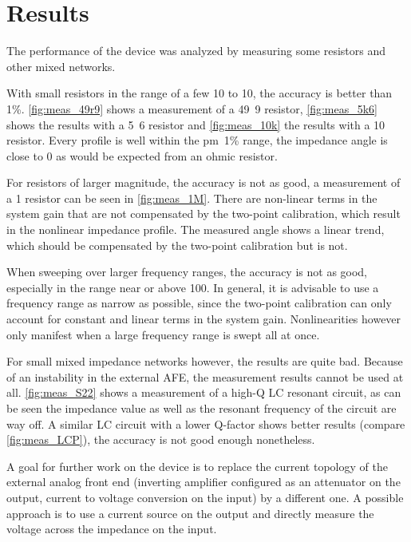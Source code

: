 \chapter{Results} \label{sec:results}

The performance of the device was analyzed by measuring some resistors and other mixed networks.

With small resistors in the range of a few \unit{10}{\ohm} to \unit{10}{\kilo\ohm}, the accuracy is better than
\unit{1}{\%}.
\autoref{fig:meas_49r9} shows a measurement of a \unit{49.9}{\ohm} resistor,
\autoref{fig:meas_5k6} shows the results with a \unit{5.6}{\kilo\ohm} resistor
and \autoref{fig:meas_10k} the results with a \unit{10}{\kilo\ohm} resistor.
Every profile is well within the \unit{\pm 1}{\%} range, the impedance angle is close to 0 as would be expected from
an ohmic resistor.

For resistors of larger magnitude, the accuracy is not as good, a measurement of a \unit{1}{\mega\ohm} resistor can be
seen in \autoref{fig:meas_1M}. There are non-linear terms in the system gain that are not compensated by the two-point
calibration, which result in the nonlinear impedance profile. The measured angle shows a linear trend, which should
be compensated by the two-point calibration but is not.

When sweeping over larger frequency ranges, the accuracy is not as good, especially in the range near or above
\unit{100}{\kilo\hertz}.
In general, it is advisable to use a frequency range as narrow as possible, since the two-point calibration can only
account for constant and linear terms in the system gain. Nonlinearities however only manifest when a large frequency
range is swept all at once.

For small mixed impedance networks however, the results are quite bad. Because of  an instability in the external AFE,
the measurement results cannot be used at all. \autoref{fig:meas_S22} shows a measurement of a high-Q LC resonant
circuit, as can be seen the impedance value as well as the resonant frequency of the circuit are way off.
A similar LC circuit with a lower Q-factor shows better results (compare \autoref{fig:meas_LCP}), the accuracy is not
good enough nonetheless.

A goal for further work on the device is to replace the current topology of the external analog front end
(inverting amplifier configured as an attenuator on the output, current to voltage conversion on the input)
by a different one. A possible approach is to use a current source on the output and directly measure the voltage
across the impedance on the input.

